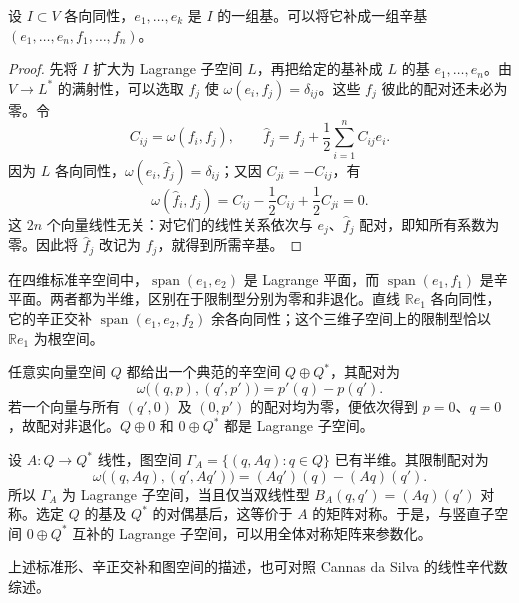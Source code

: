 \begin{proposition}\label{g4:prop:0701:adapted-basis}
	设 \(I\subset V\) 各向同性，\(e_1,\ldots,e_k\) 是 \(I\) 的一组基。可以将它补成一组辛基 \((e_1,\ldots,e_n,f_1,\ldots,f_n)\)。
\end{proposition}
\begin{proof}
	先将 \(I\) 扩大为 Lagrange 子空间 \(L\)，再把给定的基补成 \(L\) 的基 \(e_1,\ldots,e_n\)。由 \(V\to L^*\) 的满射性，可以选取 \(f_j\) 使 \(\omega(e_i,f_j)=\delta_{ij}\)。这些 \(f_j\) 彼此的配对还未必为零。令
	\[
		C_{ij}=\omega(f_i,f_j),\qquad
		\widehat f_j=f_j+\frac12\sum_{i=1}^n C_{ij}e_i.
	\]
	因为 \(L\) 各向同性，\(\omega(e_i,\widehat f_j)=\delta_{ij}\)；又因 \(C_{ji}=-C_{ij}\)，有
	\[
		\omega(\widehat f_i,\widehat f_j)
		=C_{ij}-\frac12C_{ij}+\frac12C_{ji}=0.
	\]
	这 \(2n\) 个向量线性无关：对它们的线性关系依次与 \(e_j\)、\(\widehat f_j\) 配对，即知所有系数为零。因此将 \(\widehat f_j\) 改记为 \(f_j\)，就得到所需辛基。
\end{proof}

\begin{example}\label{g4:exm:0701:planes}
	在四维标准辛空间中，\(\operatorname{span}(e_1,e_2)\) 是 Lagrange 平面，而 \(\operatorname{span}(e_1,f_1)\) 是辛平面。两者都为半维，区别在于限制型分别为零和非退化。直线 \(\mathbb Re_1\) 各向同性，它的辛正交补 \(\operatorname{span}(e_1,e_2,f_2)\) 余各向同性；这个三维子空间上的限制型恰以 \(\mathbb Re_1\) 为根空间。
\end{example}

\begin{example}\label{g4:exm:0701:lagrangian-graphs}
	任意实向量空间 \(Q\) 都给出一个典范的辛空间 \(Q\oplus Q^*\)，其配对为
	\[
		\omega\bigl((q,p),(q',p')\bigr)=p'(q)-p(q').
	\]
	若一个向量与所有 \((q',0)\) 及 \((0,p')\) 的配对均为零，便依次得到 \(p=0\)、\(q=0\)，故配对非退化。\(Q\oplus0\) 和 \(0\oplus Q^*\) 都是 Lagrange 子空间。

	设 \(A:Q\to Q^*\) 线性，图空间 \(\Gamma_A=\{(q,Aq):q\in Q\}\) 已有半维。其限制配对为
	\[
		\omega\bigl((q,Aq),(q',Aq')\bigr)=(Aq')(q)-(Aq)(q').
	\]
	所以 \(\Gamma_A\) 为 Lagrange 子空间，当且仅当双线性型 \(B_A(q,q')=(Aq)(q')\) 对称。选定 \(Q\) 的基及 \(Q^*\) 的对偶基后，这等价于 \(A\) 的矩阵对称。于是，与竖直子空间 \(0\oplus Q^*\) 互补的 Lagrange 子空间，可以用全体对称矩阵来参数化。
\end{example}

上述标准形、辛正交补和图空间的描述，也可对照 Cannas da Silva 的线性辛代数综述。\cite[第1.1节，第82--84页]{Cannas2006Symplectic}

